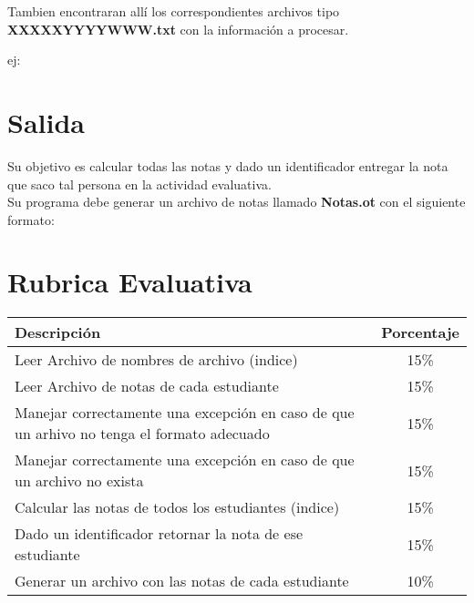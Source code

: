 Tambien encontraran allí los correspondientes archivos tipo \textbf{XXXXXYYYYWWW.txt} con la información a procesar.

ej:\\

%



\newpage

\section{Salida}
        
Su objetivo es calcular todas las notas y dado un identificador entregar la nota que saco tal persona en la actividad evaluativa.\\

Su programa debe generar un archivo de notas llamado \textbf{Notas.ot} con el siguiente formato:




\newpage

\section{Rubrica Evaluativa}


\begin{tabular}{|l|c|}
  \hline
  \textbf{Descripción} & \textbf{Porcentaje}\\
  \hline
  Leer Archivo de nombres de archivo (indice) & 15\%\\
  \hline
  Leer Archivo de notas de cada estudiante  & 15\%\\
  \hline
  Manejar correctamente una excepción en caso de que un arhivo no tenga el formato adecuado & 15\% \\
  \hline
  Manejar correctamente una excepción en caso de que un archivo no exista & 15\%\\
  \hline
  Calcular las notas de todos los estudiantes (indice) & 15\%\\
  \hline
  Dado un identificador retornar la nota de ese estudiante & 15\%\\
  \hline
  Generar un archivo con las notas de cada estudiante & 10\%\\
  \hline
\end{tabular}

